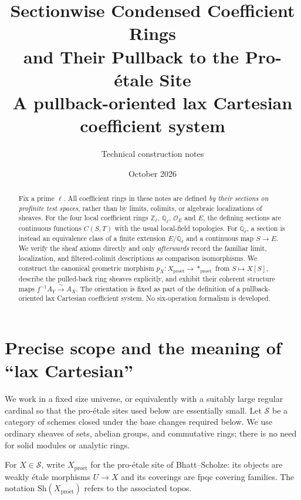 \documentclass[11pt,a4paper]{article}
\title{\bfseries Sectionwise Condensed Coefficient Rings\\[3pt]
  and Their Pullback to the Pro-\'{e}tale Site\\[5pt]
  \large A pullback-oriented lax Cartesian coefficient system}
\author{Technical construction notes}
\date{October 2026}
\numberwithin{equation}{section}
\theoremstyle{definition}
\theoremstyle{remark}
\newcommand{\Sh}{\mathrm{Sh}}
\newcommand{\proet}{\mathrm{pro\acute{e}t}}
\begin{document}
\maketitle
\vspace{-1.5em}
\begin{abstract}
Fix a prime $\ell$.  All coefficient rings in these notes are defined
\emph{by their sections on profinite test spaces}, rather than by limits,
colimits, or algebraic localizations of sheaves.  For the four local
coefficient rings $\mathbb Z_\ell$, $\mathbb Q_\ell$, $\mathcal O_E$ and
$E$, the defining sections are continuous functions $C(S,T)$ with the
usual local-field topologies.  For $\overline{\mathbb Q}_\ell$, a section
is instead an equivalence class of a finite extension $E/\mathbb Q_\ell$
and a continuous map $S\to E$.  We verify the sheaf axioms directly and
only \emph{afterwards} record the familiar limit, localization, and
filtered-colimit descriptions as comparison isomorphisms.  We construct
the canonical geometric morphism $p_X:X_{\proet}\to *_{\proet}$ from
$S\mapsto X[S]$, describe the pulled-back ring sheaves explicitly,
and exhibit their coherent structure maps
$f^{-1}A_Y\xrightarrow{\sim}A_X$.  The orientation is fixed as part
of the definition of a pullback-oriented lax Cartesian coefficient
system.  No six-operation formalism is developed.
\end{abstract}
\begingroup\small\setlength{\parskip}{0pt}\tableofcontents\endgroup

\section{Precise scope and the meaning of ``lax Cartesian''}

We work in a fixed size universe, or equivalently with a suitably large
regular cardinal so that the pro-\'{e}tale sites used below are essentially
small.  Let $\mathscr S$ be a category of schemes closed under the base
changes required below.  We use ordinary sheaves of sets, abelian groups,
and commutative rings; there is no need for solid modules or analytic rings.

For $X\in\mathscr S$, write $X_{\proet}$ for the pro-\'{e}tale site of
Bhatt--Scholze: its objects are weakly \'{e}tale morphisms $U\to X$ and
its coverings are fpqc covering families.  The notation
$\Sh(X_{\proet})$ refers to the associated topos.
\end{document}

